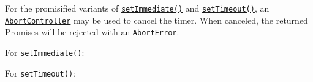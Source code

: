 For the promisified variants of
\hyperref[setimmediatecallback-args]{\texttt{setImmediate()}} and
\hyperref[settimeoutcallback-delay-args]{\texttt{setTimeout()}}, an
\href{globals.md\#class-abortcontroller}{\texttt{AbortController}} may
be used to cancel the timer. When canceled, the returned Promises will
be rejected with an
\texttt{\textquotesingle{}AbortError\textquotesingle{}}.

For \texttt{setImmediate()}:

\begin{Shaded}
\begin{Highlighting}[]
\NormalTok{ \{ }\OperatorTok{:}\OperatorTok{=} \NormalTok{(}\NormalTok{)}\OperatorTok{;}

\OperatorTok{=}  \NormalTok{()}\OperatorTok{;}
\OperatorTok{=}\OperatorTok{;}

\NormalTok{(}\OperatorTok{,}
  \NormalTok{(}\NormalTok{)}
  \KeywordTok{=\textgreater{}}\NormalTok{ \{}
     \OperatorTok{===} \NormalTok{)}
      \NormalTok{(}\NormalTok{)}\OperatorTok{;}
\NormalTok{  \})}\OperatorTok{;}

\NormalTok{()}\OperatorTok{;}
\end{Highlighting}
\end{Shaded}

For \texttt{setTimeout()}:

